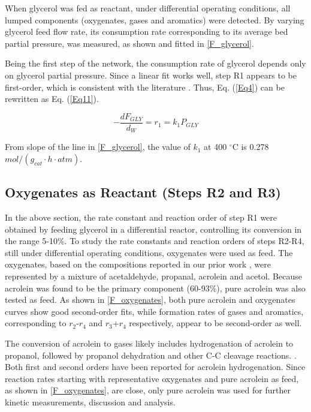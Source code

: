 \documentclass[journal=iecred,manuscript=article]{achemso}
\begin{document}
When glycerol was fed as reactant,
under differential operating conditions,
all lumped components (oxygenates, gases and aromatics) were detected.
By varying glycerol feed flow rate,
its consumption rate corresponding to its average bed partial pressure,
was measured, as shown and fitted in \ref{F_glycerol}.

Being the first step of the network,
the consumption rate of glycerol depends only on glycerol partial pressure.
Since a linear fit works well,
step R1 appears to be first-order,
which is consistent with the literature \cite{Akizuki2012, Talebian-Kiakalaieh2014, Park2015, Talebian-Kiakalaieh2015}.
Thus, Eq. (\ref{Eq4}) can be rewritten as Eq. (\ref{Eq11}).

\begin{equation} \label{Eq11}
-\frac{dF_{GLY}}{d_{W}}=r_1=k_1 P_{GLY}
\end{equation}

From slope of the line in \ref{F_glycerol}, the value of $k_1$ at 400 $^{\circ}$C is 0.278 $mol/(g_{cat} \cdot h \cdot atm)$.

\subsection{Oxygenates as Reactant (Steps R2 and R3)}

In the above section, the rate constant and reaction order of step R1 were obtained by feeding glycerol in a differential reactor,
controlling its conversion in the range 5-10\%.
To study the rate constants and reaction orders of steps R2-R4,
still under differential operating conditions,
oxygenates were used as feed.
The oxygenates, based on the compositions reported in our prior work \cite{Xiao2016},
were represented by a mixture of acetaldehyde, propanal, acrolein and acetol.
Because acrolein was found to be the primary component (60-93\%), pure acrolein was also tested as feed.
As shown in \ref{F_oxygenates}, both pure acrolein and oxygenates curves show good second-order fits,
while formation rates of gases and aromatics, corresponding to  $r_2$-$r_4$ and $r_3$+$r_4$ respectively, appear to be second-order as well.

The conversion of acrolein to gases likely includes hydrogenation of acrolein to propanol, followed by propanol dehydration and other C-C cleavage reactions.
 \cite{Marinelli1995, Mohr2000, Volckmar2009}.
Both first and second orders have been reported for acrolein hydrogenation\cite{Jesus1999, Wei2013}.
Since reaction rates starting with representative oxygenates and pure acrolein as feed, as shown in \ref{F_oxygenates}, are close,
only pure acrolein was used for further kinetic measurements, discussion and analysis.
\end{document}
